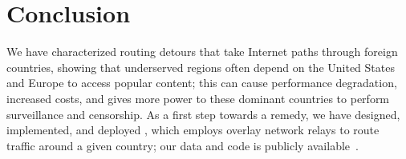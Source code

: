 \section{Conclusion}
\label{conclusion}

We have characterized routing
detours that take Internet paths through foreign countries, showing 
that underserved regions often depend on the United States and Europe to 
access popular content; this can cause performance degradation, increased costs, 
and gives more power to these dominant countries to perform surveillance and censorship.   %
As a first step towards a remedy, we have
designed, implemented, and deployed \system{}, which employs overlay network
relays to  route traffic around a given country; our data and code is publicly available~\cite{ransom_data,ran_system}.  %

